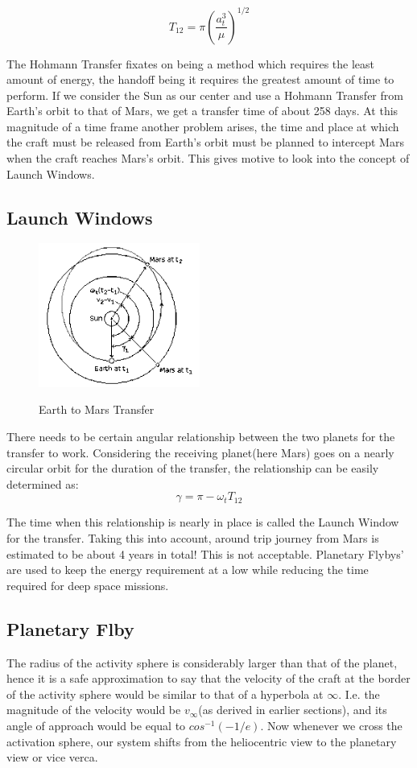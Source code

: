 \documentclass[12pt, letterpaper]{article}
\begin{document}
\[
	T_{12} = \pi \left(\frac{a_t^3}{\mu}\right)^{1/2}
\]

The Hohmann Transfer fixates on being a method which requires the least amount of energy, the handoff being it requires the greatest amount of time to perform. If we consider the Sun as our center and use a Hohmann Transfer from Earth's orbit to that of Mars, we get a transfer time of about 258 days. At this magnitude of a time frame another problem arises, the time and place at which the craft must be released from Earth's orbit must be planned to intercept Mars when the craft reaches Mars's orbit. This gives motive to look into the concept of Launch Windows.

\subsection{Launch Windows}
\begin{figure}[h!]
	\centering
    \includegraphics[width = 200px]{Mars}
    \label{fig:Mars}
    \caption{Earth to Mars Transfer}
\end{figure}

There needs to be certain angular relationship between the two planets for the transfer to work. Considering the receiving planet(here Mars) goes on a nearly circular orbit for the duration of the transfer, the relationship can be easily determined as:
\[
	\gamma = \pi - \omega_{t} T_{12}
\]

The time when this relationship is nearly in place is called the Launch Window for the transfer. Taking this into account, around trip journey from Mars is estimated to be about 4 years in total! This is not acceptable. Planetary Flybys' are used to keep the energy requirement at a  low while reducing the time required for deep space missions.

\subsection{Planetary Flby}

The radius of the activity sphere is considerably larger than that of the planet, hence it is a safe approximation to say that the velocity of the craft at the border of the activity sphere would be similar to that of a hyperbola at $\infty$. I.e. the magnitude of the velocity would be $v_{\infty}$(as derived in earlier sections), and its angle of approach would be equal to $cos^{-1}(-1/e)$. Now whenever we cross the activation sphere, our system shifts from the heliocentric view to the planetary view or vice verca. 
\end{document}

